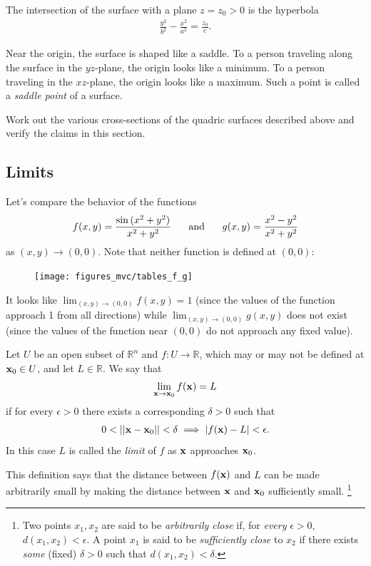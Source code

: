 \documentclass[12pt,letterpaper,reqno]{article}
\numberwithin{equation}{section}
\newcommand{\R}{\ensuremath{\mathbb R}}
\newcommand{\bx}{{\bf x}}
\begin{document}
{The intersection of the surface with a plane $z=z_0>0$ is the hyperbola
\begin{align*}
	\frac{y^2}{b^2}-\frac{x^2}{a^2}=\frac{z_0}{c}.
\end{align*}

Near the origin, the surface is shaped like a saddle. To a person traveling along the surface in the $yz$-plane, the origin looks like a minimum. To a person traveling in the $xz$-plane, the origin looks like a maximum. Such a point is called a \emph{saddle point} of a surface.

\begin{exercise}
Work out the various cross-sections of the quadric surfaces described above and verify the claims in this section.	
\end{exercise}

\newpage 

\subsection{Limits}
Let's compare the behavior of the functions
\begin{align*}
	f(x,y)=\frac{\sin{(x^2+y^2)}}{x^2+y^2} \hspace{0.5cm} \text{ and } \hspace{0.5cm} g(x,y)=\frac{x^2-y^2}{x^2+y^2}
\end{align*}
as $(x,y) \to (0,0)$. Note that neither function is defined at $(0,0)$:

\begin{figure}[h]
\begin{center}
\texttt{[image: figures\_mvc/tables\_f\_g]}
\end{center}	
\end{figure}
It looks like $\lim_{(x,y) \to (0,0)}f(x,y)=1$ (since the values of the function approach 1 from all directions) while $\lim_{(x,y) \to (0,0)}g(x,y)$ does not exist (since the values of the function near $(0,0)$ do not approach any fixed value).

\begin{defn}[Limit]\label{def:limit}
Let $U$ be an open subset of $\R^n$ and $f:U \to \mathbb{R}$, which may or may not be defined at $\bx_0 \in U$, and let $L \in \mathbb{R}$. We say that 
\begin{align*}
	\lim_{\bx \to \bx_0}f(\bx)=L
\end{align*}
if for every $\epsilon > 0$ there exists a corresponding $\delta>0$ such that
\begin{align*}
	0<||\bx-\bx_0||<\delta \implies |f(\bx)-L|<\epsilon.
\end{align*}
In this case $L$ is called the \emph{limit} of $f$ as $\bx$ approaches $\bx_0$.
\end{defn}
This definition says that the distance between $f(\bx)$ and $L$ can be made arbitrarily small by making the distance between $\bx$ and  $\bx_0$ sufficiently small. \footnote{Two points $x_1,x_2$ are said to be \emph{arbitrarily close} if, for \emph{every} $\epsilon>0$, $d(x_1,x_2)<\epsilon$. A point $x_1$ is said to be \emph{sufficiently close} to $x_2$ if there exists \emph{some} (fixed) $\delta>0$ such that $d(x_1,x_2)<\delta$.}

}
\end{document}
